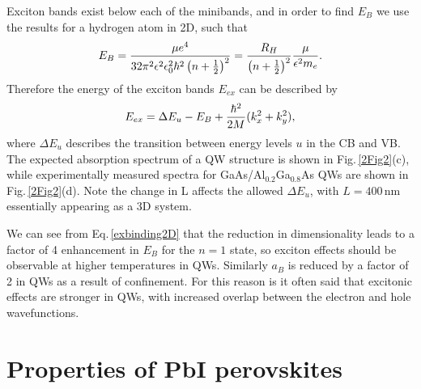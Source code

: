 Exciton bands exist below each of the minibands, and in order to find $E_B$ we use the results for a hydrogen atom in 2D, such that
\begin{equation}
\centering
E_B =\frac{\mu e^4}{32\pi^2\epsilon^2\epsilon_0^2\hbar^2\left(n+\frac{1}{2}\right)^2} = \frac{R_H}{\left(n+\frac{1}{2}\right)^2}\frac{\mu}{\epsilon^2 m_e} .
\label{exbinding2D}
\end{equation}
Therefore the energy of the exciton bands $E_{ex}$ can be described by
\begin{equation}
\centering
E_{ex} = \Delta E_u - E_B + \frac{\hbar^2}{2M}(k_x^2+k_y^2) ,
\label{exenergy2D}
\end{equation}
where $\Delta E_u$ describes the transition between energy levels $u$ in the CB and VB. The expected absorption spectrum of a QW structure is shown in Fig.\,\ref{2Fig2}(c), while experimentally measured spectra for GaAs/Al$_{0.2}$Ga$_{0.8}$As QWs are shown in Fig.\,\ref{2Fig2}(d). Note the change in L affects the allowed $\Delta E_u$, with $L=400$\,nm essentially appearing as a 3D system.

We can see from Eq.\,\ref{exbinding2D} that the reduction in dimensionality leads to a factor of 4 enhancement in $E_B$ for the $n=1$ state, so exciton effects should be observable at higher temperatures in QWs. Similarly $a_B$ is reduced by a factor of 2 in QWs as a result of confinement. For this reason is it often said that excitonic effects are stronger in QWs, with increased overlap between the electron and hole wavefunctions.

\section{Properties of PbI perovskites}
